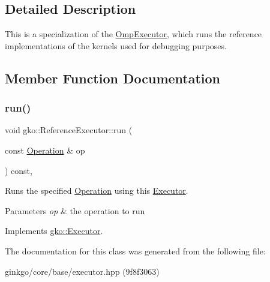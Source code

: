 \subsection{Detailed Description}
This is a specialization of the \hyperlink{classgko_1_1OmpExecutor}{Omp\+Executor}, which runs the reference implementations of the kernels used for debugging purposes. 

\subsection{Member Function Documentation}
\mbox{\label{classgko_1_1ReferenceExecutor_a82b41b42dbd26e8ac5b0146de79e5d34}} 
\subsubsection{\texorpdfstring{run()}{run()}}
{\footnotesize\ttfamily void gko\+::\+Reference\+Executor\+::run (\begin{DoxyParamCaption}\item[{const \hyperlink{classgko_1_1Operation}{Operation} \&}]{op }\end{DoxyParamCaption}) const\hspace{0.3cm}{\ttfamily [override]}, {\ttfamily [virtual]}}



Runs the specified \hyperlink{classgko_1_1Operation}{Operation} using this \hyperlink{classgko_1_1Executor}{Executor}. 


\begin{DoxyParams}{Parameters}
{\em op} & the operation to run \\
\hline
\end{DoxyParams}


Implements \hyperlink{classgko_1_1Executor_a1de8e2668b76e66690acf5eef9e8324d}{gko\+::\+Executor}.



The documentation for this class was generated from the following file\+:\begin{DoxyCompactItemize}
\item 
ginkgo/core/base/executor.\+hpp (9f8f3063)\end{DoxyCompactItemize}
